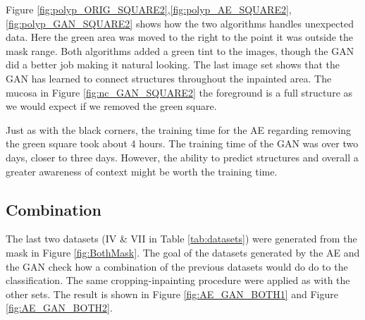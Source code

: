 Figure \ref{fig:polyp_ORIG_SQUARE2},\ref{fig:polyp_AE_SQUARE2},\ref{fig:polyp_GAN_SQUARE2} shows how the two algorithms handles unexpected data. Here the green area was moved to the right to the point it was outside the mask range. Both algorithms added a green tint to the images, though the GAN did a better job making it natural looking. 
The last image set shows that the GAN has learned to connect structures throughout the inpainted area. The mucosa in Figure \ref{fig:nc_GAN_SQUARE2} the foreground is a full structure as we would expect if we removed the green square.
 


\vspace{5px}
\noindent Just as with the black corners, the training time for the AE regarding removing the green square took about 4 hours. 
The training time of the GAN was over two days, closer to three days. However, the ability to predict structures and overall a greater awareness of context might be worth the training time.

\FloatBarrier
\subsection{Combination}
The last two datasets (IV \& VII in Table \ref{tab:datasets}) were generated from the mask in Figure \ref{fig:BothMask}. The goal of the datasets generated by the AE and the GAN check how a combination of the previous datasets would do do to the classification. The same cropping-inpainting procedure were applied as with the other sets. The result is shown in Figure \ref{fig:AE_GAN_BOTH1} and Figure \ref{fig:AE_GAN_BOTH2}.

